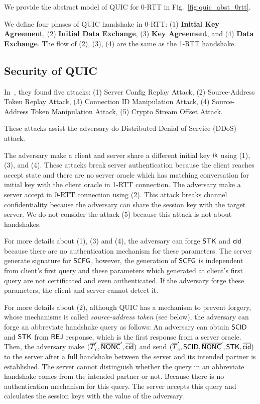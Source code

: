 We provide the abstract model of QUIC for 0-RTT in
Fig.~\ref{fig:quic_abst_0rtt}.
%

%
We define four phases of QUIC handshake in 0-RTT:
(1) \textbf{Initial Key Agreement},
(2) \textbf{Initial Data Exchange},
(3) \textbf{Key Agreement}, and
(4) \textbf{Data Exchange}.
The flow of (2), (3), (4) are the same as the 1-RTT
handshake.



\subsection{Security of QUIC} \label{sec:quic_detail}

In~\cite{LJBN15:QUIC}, they found five attacks:
(1) Server Config Replay Attack,
(2) Source-Address Token Replay Attack,
(3) Connection ID Manipulation Attack,
(4) Source-Address Token Manipulation Attack,
(5) Crypto Stream Offset Attack.

These attacks assist the adversary do Distributed Denial of Service
(DDoS) attack.

The adversary make a client and server share a different
initial key $\mathsf{ik}$ using (1), (3), and (4).
These attacks break server authentication because the client
reaches accept state and there are no server oracle which has
matching conversation for initial key with the client oracle in 1-RTT connection.
The adversary make a server accept in 0-RTT connection
using (2).
This attack breaks channel confidentiality because the adversary
can share the session key with the target server.
We do not consider the attack (5) because this attack is not
about handshakes.

For more details about (1), (3) and (4), the adversary can forge
$\mathsf{STK}$ and $\mathsf{cid}$ because there are no authentication mechanism
for these parameters.
The server generate signature for $\mathsf{SCFG}$, however, the generation
of $\mathsf{SCFG}$ is independent from client's first query and these parameters
which generated at client's first query
are not certificated and even authenticated.
If the adversary forge these parameters, the client and server cannot
detect it.

For more details about (2), although QUIC has a mechanism to prevent forgery,
whose mechanisms is called \textit{source-address token}
(see below), the adversary can forge an abbreviate handshake
query as follows: An adversary can obtain $\mathsf{SCID}$ and $\mathsf{STK}$ from $\mathsf{REJ}$
response, which is the first response from a server oracle.
Then, the adversary make $(\overline{T}_c^{\prime},
\overline{\mathsf{NONC}}^{\prime}, \overline{\mathsf{cid}})$ and send $(\overline{T}_c^{\prime},
\mathsf{SCID}, \overline{\mathsf{NONC}}^{\prime}, \mathsf{STK}, \overline{\mathsf{cid}})$ to the server after a
full handshake between the server and its intended partner
is established.
The server cannot distinguish whether the query in an abbreviate handshake
comes from the intended partner or not. Because there is no
authentication mechanism for this query. The server accepts
this query and calculates the session keys with the value
of the adversary.

